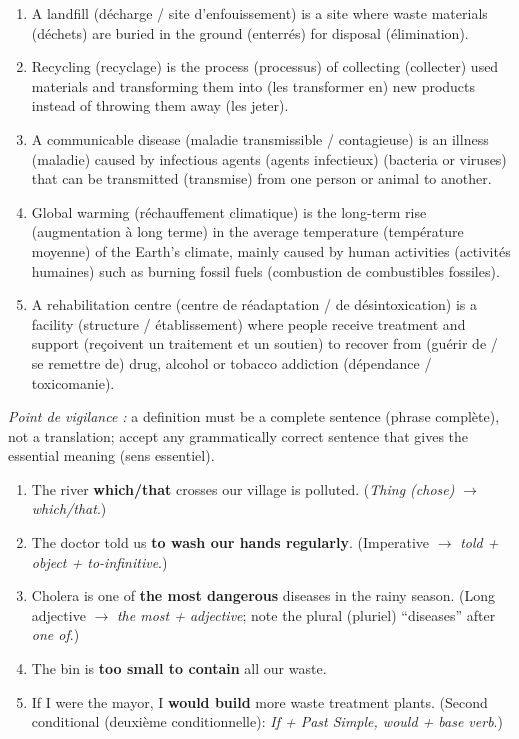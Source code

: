 \documentclass[11pt]{article}
\newcommand{\cle}[1]{{\popxbold\color{popdark}#1}}
\begin{document}
\begin{corrige}
\begin{enumerate}
\item A \cle{landfill (décharge / site d'enfouissement)} is a site where \cle{waste materials (déchets)} are \cle{buried in the ground (enterrés)} for \cle{disposal (élimination)}.
\item \cle{Recycling (recyclage)} is the \cle{process (processus)} of \cle{collecting (collecter)} used materials and \cle{transforming them into (les transformer en)} new products instead of \cle{throwing them away (les jeter)}.
\item A \cle{communicable disease (maladie transmissible / contagieuse)} is an \cle{illness (maladie)} caused by \cle{infectious agents (agents infectieux)} (bacteria or viruses) that can be \cle{transmitted (transmise)} from one person or animal to another.
\item \cle{Global warming (réchauffement climatique)} is the \cle{long-term rise (augmentation à long terme)} in the \cle{average temperature (température moyenne)} of the Earth's climate, mainly caused by \cle{human activities (activités humaines)} such as \cle{burning fossil fuels (combustion de combustibles fossiles)}.
\item A \cle{rehabilitation centre (centre de réadaptation / de désintoxication)} is a \cle{facility (structure / établissement)} where people \cle{receive treatment and support (reçoivent un traitement et un soutien)} to \cle{recover from (guérir de / se remettre de)} drug, alcohol or tobacco \cle{addiction (dépendance / toxicomanie)}.
\end{enumerate}
\emph{Point de vigilance :} a definition must be a \cle{complete sentence (phrase complète)}, not a translation; accept any grammatically correct sentence that gives the \cle{essential meaning (sens essentiel)}.
\end{corrige}

\begin{corrige}
\begin{enumerate}
\item The river \textbf{which/that} crosses our village is polluted. (\emph{Thing (chose)} $\to$ \emph{which/that}.)
\item The doctor told us \textbf{to wash our hands regularly}. (Imperative $\to$ \emph{told + object + to-infinitive}.)
\item Cholera is one of \textbf{the most dangerous} diseases in the rainy season. (Long adjective $\to$ \emph{the most + adjective}; note the \cle{plural (pluriel)} ``diseases'' after \emph{one of}.)
\item The bin is \textbf{too small to contain} all our waste.
\item If I were the mayor, I \textbf{would build} more waste treatment plants. (\cle{Second conditional (deuxième conditionnelle)}: \emph{If + Past Simple, would + base verb}.)
\end{enumerate}
\end{corrige}
\end{document}
